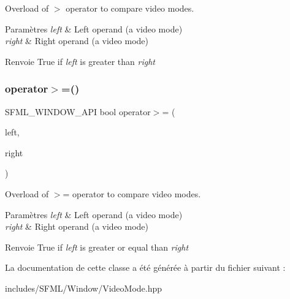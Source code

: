 Overload of $>$ operator to compare video modes. 


\begin{DoxyParams}{Paramètres}
{\em left} & Left operand (a video mode) \\
\hline
{\em right} & Right operand (a video mode)\\
\hline
\end{DoxyParams}
\begin{DoxyReturn}{Renvoie}
True if {\itshape left} is greater than {\itshape right} 
\end{DoxyReturn}
\mbox{\label{classsf_1_1VideoMode_a7f7983e336203d34c9878c77fff60f1f}} 
\subsubsection{\texorpdfstring{operator$>$=()}{operator>=()}}
{\footnotesize\ttfamily S\+F\+M\+L\+\_\+\+W\+I\+N\+D\+O\+W\+\_\+\+A\+PI bool operator$>$= (\begin{DoxyParamCaption}\item[{const \hyperlink{classsf_1_1VideoMode}{Video\+Mode} \&}]{left,  }\item[{const \hyperlink{classsf_1_1VideoMode}{Video\+Mode} \&}]{right }\end{DoxyParamCaption})\hspace{0.3cm}{\ttfamily [related]}}



Overload of $>$= operator to compare video modes. 


\begin{DoxyParams}{Paramètres}
{\em left} & Left operand (a video mode) \\
\hline
{\em right} & Right operand (a video mode)\\
\hline
\end{DoxyParams}
\begin{DoxyReturn}{Renvoie}
True if {\itshape left} is greater or equal than {\itshape right} 
\end{DoxyReturn}


La documentation de cette classe a été générée à partir du fichier suivant \+:\begin{DoxyCompactItemize}
\item 
includes/\+S\+F\+M\+L/\+Window/Video\+Mode.\+hpp\end{DoxyCompactItemize}
